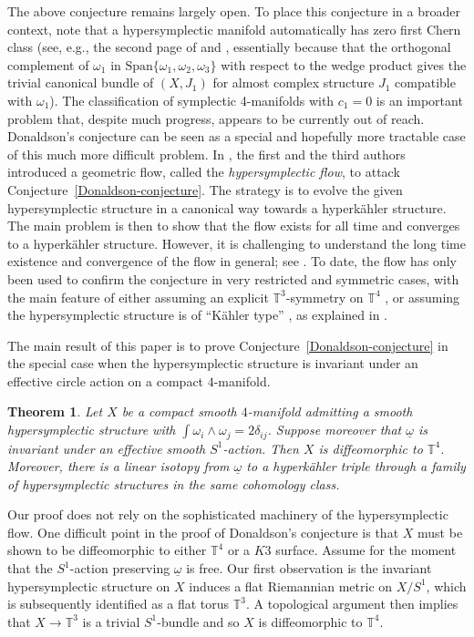 \documentclass[11pt]{amsart}
\theoremstyle{plain}
\newtheorem{theorem}{Theorem}
\theoremstyle{definition}
\theoremstyle{plain}
\theoremstyle{definition}
\numberwithin{equation}{section}
\numberwithin{theorem}{section}
\begin{document}
The above conjecture remains largely open. To place this conjecture in a broader context, note that a hypersymplectic manifold automatically has zero first Chern class (see, e.g., the second page of \cite{FY} and \cite[Lemma 4]{FY2}, essentially because that the orthogonal complement of $\omega_1$ in $\text{Span}\{\omega_1, \omega_2,\omega_3\}$ with respect to the wedge product gives the trivial canonical bundle of $\left(X,J_1\right)$ for almost complex structure $J_1$ compatible with $\omega_1$). The classification of symplectic 4-manifolds with $c_1=0$ is an important problem that, despite much progress, appears to be currently out of reach. Donaldson's conjecture can be seen as a special and hopefully more tractable case of this much more difficult problem. In \cite{FY}, the first and the third authors introduced a geometric flow, called the \emph{hypersymplectic flow}, to attack Conjecture~\ref{Donaldson-conjecture}. The strategy is to evolve the given hypersymplectic structure in a canonical way towards a hyperk\"ahler structure.  The main problem is then to show that the flow exists for all time and converges to a hyperk\"ahler structure. However, it is challenging to understand the long time existence and convergence of the flow in general; see \cite{FY2}. To date, the flow has only been used to confirm the conjecture in very restricted and symmetric cases, with the main feature of either assuming an explicit $\mathbb{T}^3$-symmetry  on $\mathbb{T}^4$ \cite{FHY, HWY}, or assuming the hypersymplectic structure is of ``K\"ahler type'' \cite{PS}, as explained in \cite[Section 1.3]{FHY}. 

The main result of this paper is to prove Conjecture~\ref{Donaldson-conjecture} in the special case when the hypersymplectic structure is invariant under an effective circle action on a compact $4$-manifold.
\begin{theorem}\label{main-theorem}
    Let $X$ be a compact smooth $4$-manifold admitting a smooth hypersymplectic structure with $\int \omega_i \wedge \omega_j = 2 \delta_{ij}$. Suppose moreover that $\underline{\omega}$ is invariant under an effective smooth $S^1$-action. Then $X$ is diffeomorphic to $\mathbb{T}^4$. Moreover, there is a linear isotopy from $\underline\omega$ to a hyperk\"ahler triple through a family of hypersymplectic structures in the same cohomology class.
\end{theorem}

Our proof does not rely on the sophisticated machinery of the hypersymplectic flow. 
One difficult point in the proof of Donaldson's conjecture is that $X$ must be shown to be diffeomorphic to either $\mathbb{T}^4$ or a $K3$ surface. Assume for the moment that the $S^1$-action preserving $\underline{\omega}$ is free. Our first observation is the invariant hypersymplectic structure on $X$ induces a flat Riemannian metric on $X/S^1$, which is subsequently identified as a flat torus $\mathbb{T}^3$. A topological argument then implies that $X \to \mathbb{T}^3$ is a trivial $S^1$-bundle and so $X$ is diffeomorphic to $\mathbb{T}^4$. 
\end{document}
